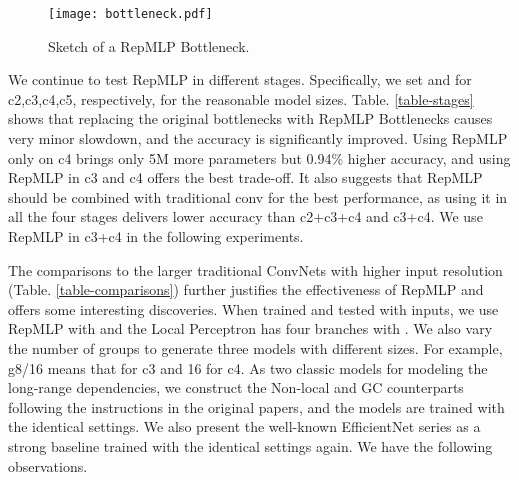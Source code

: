 \documentclass[10pt,twocolumn,letterpaper]{article}
\begin{document}
\begin{figure}
	\begin{center}
		\texttt{[image: bottleneck.pdf]}
		\vspace{-0.20in}
		\caption{Sketch of a RepMLP Bottleneck.}
		\label{fig-repmlp-resnet}
		\vspace{-0.3in}
	\end{center}
\end{figure}



We continue to test RepMLP in different stages. Specifically, we set  and  for c2,c3,c4,c5, respectively, for the reasonable model sizes. Table. \ref{table-stages} shows that replacing the original bottlenecks with RepMLP Bottlenecks causes very minor slowdown, and the accuracy is significantly improved. Using RepMLP only on c4 brings only 5M more parameters but 0.94\% higher accuracy, and using RepMLP in c3 and c4 offers the best trade-off. It also suggests that RepMLP should be combined with traditional conv for the best performance, as using it in all the four stages delivers lower accuracy than c2+c3+c4 and c3+c4. We use RepMLP in c3+c4 in the following experiments.

The comparisons to the larger traditional ConvNets with higher input resolution (Table. \ref{table-comparisons}) further justifies the effectiveness of RepMLP and offers some interesting discoveries. When trained and tested with  inputs, we use RepMLP with  and the Local Perceptron has four branches with . We also vary the number of groups to generate three models with different sizes. For example, g8/16 means that  for c3 and 16 for c4. As two classic models for modeling the long-range dependencies, we construct the Non-local \cite{wang2018non} and GC \cite{cao2019gcnet} counterparts following the instructions in the original papers, and the models are trained with the identical settings. We also present the well-known EfficientNet \cite{efficientnet} series as a strong baseline trained with the identical settings again. We have the following observations.
\end{document}
